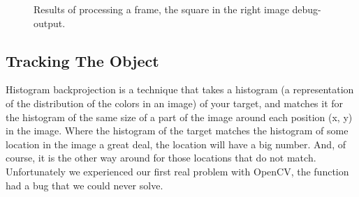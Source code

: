\begin{figure}
  \centering
  \hspace{1cm}
  \caption{Results of processing a frame, the square in the right image debug-output.}
  \label{processed}
\end{figure}

\subsection{Tracking The Object}
Histogram backprojection is a technique that takes a histogram (a representation of the distribution of the colors in an image) of your target, and matches it for the
histogram of the same size of a part of the image around each position (x, y) in the image. Where the histogram of the target matches the histogram of some location in the
image a great deal, the location will have a big number. And, of course, it is the other way around for those locations that do not match. 
Unfortunately we experienced our first real problem with OpenCV, the function had a bug that we could never solve.  \\

